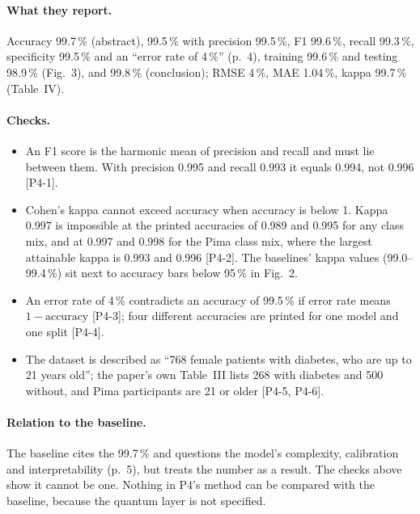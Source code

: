 \documentclass[11pt,a4paper]{article}
\newcommand{\chk}[1]{\textsf{\small [#1]}}
\begin{document}
\paragraph{What they report.} Accuracy 99.7\,\% (abstract), 99.5\,\% with precision 99.5\,\%, F1 99.6\,\%, recall 99.3\,\%, specificity 99.5\,\% and an ``error rate of 4\,\%'' (p.~4), training 99.6\,\% and testing 98.9\,\% (Fig.~3), and 99.8\,\% (conclusion); RMSE 4\,\%, MAE 1.04\,\%, kappa 99.7\,\% (Table~IV).

\paragraph{Checks.}
\begin{itemize}
  \item An F1 score is the harmonic mean of precision and recall and must lie between them. With precision 0.995 and recall 0.993 it equals 0.994, not 0.996 \chk{P4-1}.
  \item Cohen's kappa cannot exceed accuracy when accuracy is below 1. Kappa 0.997 is impossible at the printed accuracies of 0.989 and 0.995 for any class mix, and at 0.997 and 0.998 for the Pima class mix, where the largest attainable kappa is 0.993 and 0.996 \chk{P4-2}. The baselines' kappa values (99.0--99.4\,\%) sit next to accuracy bars below 95\,\% in Fig.~2.
  \item An error rate of 4\,\% contradicts an accuracy of 99.5\,\% if error rate means $1-\text{accuracy}$ \chk{P4-3}; four different accuracies are printed for one model and one split \chk{P4-4}.
  \item The dataset is described as ``768 female patients with diabetes, who are up to 21 years old''; the paper's own Table~III lists 268 with diabetes and 500 without, and Pima participants are 21 or older \chk{P4-5, P4-6}.
\end{itemize}

\paragraph{Relation to the baseline.} The baseline cites the 99.7\,\% and questions the model's complexity, calibration and interpretability (p.~5), but treats the number as a result. The checks above show it cannot be one. Nothing in P4's method can be compared with the baseline, because the quantum layer is not specified.
\end{document}
